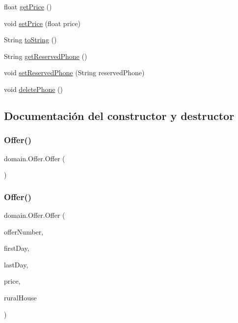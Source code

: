 \begin{DoxyCompactItemize}
\item 
float \mbox{\hyperlink{classdomain_1_1_offer_a4ebf9c6f415709b527e006fdffa3a0c3}{get\+Price}} ()
\item 
void \mbox{\hyperlink{classdomain_1_1_offer_a8bd526902732e030571b6889c5507f4c}{set\+Price}} (float price)
\item 
String \mbox{\hyperlink{classdomain_1_1_offer_a8838b2d4c6616394f1829d4dc5572952}{to\+String}} ()
\item 
String \mbox{\hyperlink{classdomain_1_1_offer_ac7962273d54b3a99a40ce86c4ce53289}{get\+Reserved\+Phone}} ()
\item 
void \mbox{\hyperlink{classdomain_1_1_offer_ac79a4a4efc643fb5bd0e8a423c96dde4}{set\+Reserved\+Phone}} (String reserved\+Phone)
\item 
void \mbox{\hyperlink{classdomain_1_1_offer_a5eed495d6abcc8635d4e702cf39779c7}{delete\+Phone}} ()
\end{DoxyCompactItemize}


\subsection{Documentación del constructor y destructor}
\mbox{\label{classdomain_1_1_offer_ae82665e8df101e5a20b41dc06f74a789}} 
\subsubsection{\texorpdfstring{Offer()}{Offer()}\hspace{0.1cm}{\footnotesize\ttfamily [1/3]}}
{\footnotesize\ttfamily domain.\+Offer.\+Offer (\begin{DoxyParamCaption}{ }\end{DoxyParamCaption})}

\mbox{\label{classdomain_1_1_offer_a86a7d5eec8c0f93f844e15e057a34555}} 
\subsubsection{\texorpdfstring{Offer()}{Offer()}\hspace{0.1cm}{\footnotesize\ttfamily [2/3]}}
{\footnotesize\ttfamily domain.\+Offer.\+Offer (\begin{DoxyParamCaption}\item[{int}]{offer\+Number,  }\item[{Date}]{first\+Day,  }\item[{Date}]{last\+Day,  }\item[{float}]{price,  }\item[{\mbox{\hyperlink{classdomain_1_1_rural_house}{Rural\+House}}}]{rural\+House }\end{DoxyParamCaption})}

